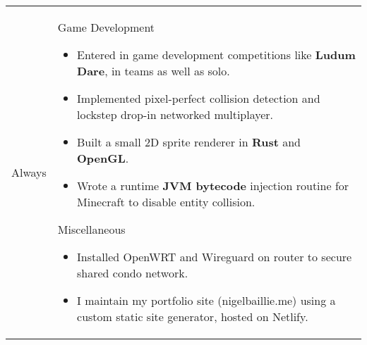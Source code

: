 \documentclass[11pt]{article}
\newenvironment{timeline}
        {\begin{tabular}{p{21 mm}|p{150 mm}}}
        {\end{tabular}}
\newenvironment{timelinetitle}
        {\vspace{-2 mm}\begin{large}}
        {\end{large}\vspace{-1.5 mm}}
\newcommand{\timespan}[2]{{#2}\newline{#1}}
\begin{document}
\begin{timeline}
\timespan{2011}{Always}
&
\begin{timelinetitle}
    Game Development
\end{timelinetitle}
\begin{itemize}
  \item[] Entered in game development competitions like \textbf{Ludum Dare}, in teams as well as solo.

  \item[] Implemented pixel-perfect collision detection and lockstep drop-in networked multiplayer.

  \item[] Built a small 2D sprite renderer in \textbf{Rust} and \textbf{OpenGL}.

  \item[] Wrote a runtime \textbf{JVM bytecode} injection routine for Minecraft to disable entity collision.
\end{itemize}

\vspace{0.5cm}

\begin{timelinetitle}
    Miscellaneous
\end{timelinetitle}
\begin{itemize}
  \item[] Installed OpenWRT and Wireguard on router to secure shared condo network.

  \item[] I maintain my portfolio site (nigelbaillie.me) using a custom static site generator, hosted on Netlify.
\end{itemize}

\end{timeline}
\end{document}
